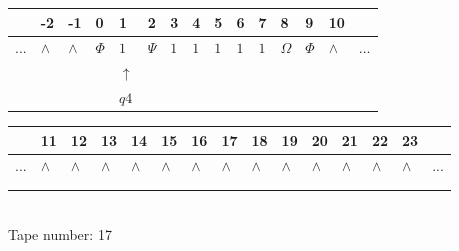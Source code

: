 \documentclass[11pt]{article}
\begin{document}
\begin{table}[H]
\centering
\begin{tabular}{lllllllllllllll}
 & -2 & -1 & 0 & 1 & 2 & 3 & 4 & 5 & 6 & 7 & 8 & 9 & 10 & \\
\hline
$...$ & \multicolumn{1}{|l|}{$\wedge$} & \multicolumn{1}{|l|}{$\wedge$} & \multicolumn{1}{|l|}{$\Phi$} & \multicolumn{1}{|l|}{$1$} & \multicolumn{1}{|l|}{$\Psi$} & \multicolumn{1}{|l|}{$1$} & \multicolumn{1}{|l|}{$1$} & \multicolumn{1}{|l|}{$1$} & \multicolumn{1}{|l|}{$1$} & \multicolumn{1}{|l|}{$1$} & \multicolumn{1}{|l|}{$\Omega$} & \multicolumn{1}{|l|}{$\Phi$} & \multicolumn{1}{|l|}{$\wedge$} & $...$\\
\hline
&  &  &  & $\uparrow$ &  &  &  &  &  &  &  &  &  &  \\
&  &  &  & $ q4 $ &  &  &  &  &  &  &  &  &  &  \\
\end{tabular}
\begin{tabular}{lllllllllllllll}
 & 11 & 12 & 13 & 14 & 15 & 16 & 17 & 18 & 19 & 20 & 21 & 22 & 23 & \\
\hline
$...$ & \multicolumn{1}{|l|}{$\wedge$} & \multicolumn{1}{|l|}{$\wedge$} & \multicolumn{1}{|l|}{$\wedge$} & \multicolumn{1}{|l|}{$\wedge$} & \multicolumn{1}{|l|}{$\wedge$} & \multicolumn{1}{|l|}{$\wedge$} & \multicolumn{1}{|l|}{$\wedge$} & \multicolumn{1}{|l|}{$\wedge$} & \multicolumn{1}{|l|}{$\wedge$} & \multicolumn{1}{|l|}{$\wedge$} & \multicolumn{1}{|l|}{$\wedge$} & \multicolumn{1}{|l|}{$\wedge$} & \multicolumn{1}{|l|}{$\wedge$} & $...$\\
\hline
&  &  &  &  &  &  &  &  &  &  &  &  &  &  \\
&  &  &  &  &  &  &  &  &  &  &  &  &  &  \\
\end{tabular}
\\
Tape number: 17
\noindent\makebox[\linewidth]{\hdashrule{\textwidth}{1pt}{1pt}}\end{table}
\end{document}
